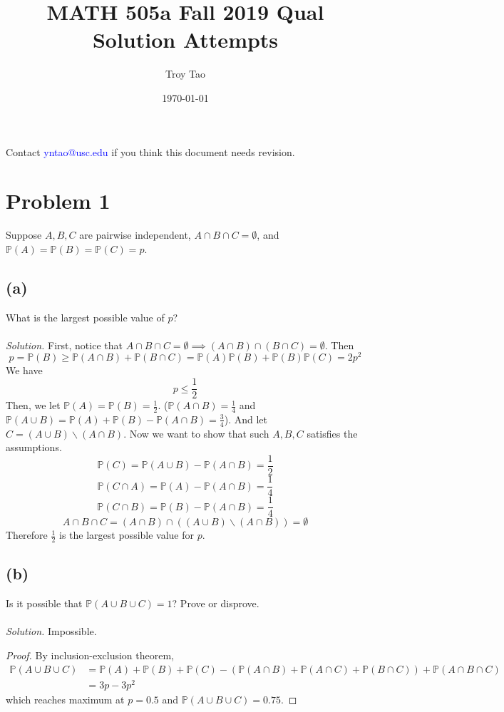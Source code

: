 \documentclass{article}
\title{MATH 505a Fall 2019 Qual Solution Attempts}
\author{Troy Tao}
\date\today
\newcommand{\prob}{\mathbb{P}}
\begin{document}
\maketitle 
Contact \textcolor{blue}{yntao@usc.edu} if you think this document needs revision.


\section*{Problem 1}
Suppose $A,B,C$ are pairwise independent, $A\cap B\cap C = \emptyset$, and $\prob(A)=\prob(B)=\prob(C)=p$.
\subsection*{(a)}
What is the largest possible value of $p$?
\color{blue}
\\\\\textit{Solution. }First, notice that $A\cap B\cap C = \emptyset \implies (A\cap B)\cap (B\cap C) = \emptyset$. Then 
$$p=\prob(B)\geq\prob(A\cap B)+\prob(B\cap C)=\prob(A)\prob(B)+\prob(B)\prob(C)=2p^2$$
We have
$$p\leq \frac{1}{2}$$
Then, we let $\prob(A)=\prob(B)=\frac{1}{2}$. ($\prob(A\cap B) = \frac{1}{4}$ and $\prob(A \cup B) = \prob(A)+\prob(B) - \prob(A\cap B) = \frac{3}{4}$). And let $C = (A\cup B)\backslash (A\cap B)$. Now we want to show that such $A,B,C$ satisfies the assumptions. 
$$\prob(C) = \prob(A\cup B)-\prob(A\cap B)=\frac{1}{2}$$
$$\prob(C\cap A) = \prob(A)-\prob(A\cap B) = \frac{1}{4}$$
$$\prob(C\cap B) = \prob(B)-\prob(A\cap B) = \frac{1}{4}$$
$$A\cap B\cap C =(A\cap B)\cap((A\cup B)\backslash(A\cap B))=\emptyset$$
Therefore $\frac{1}{2}$ is the largest possible value for $p$.
\color{black}
\subsection*{(b)}
Is it possible that $\prob(A\cup B\cup C)=1$? Prove or disprove.
\color{blue}
\\\\\textit{Solution. }Impossible.
\begin{proof}
By inclusion-exclusion theorem,
\begin{equation*}
    \begin{split}
        \prob(A\cup B\cup C) &= \prob(A)+\prob(B)+\prob(C)-(\prob(A\cap B)+\prob(A\cap C)+\prob(B\cap C))+\prob(A\cap B\cap C)\\
        &= 3p-3p^2
    \end{split}
\end{equation*}
which reaches maximum at $p = 0.5$ and $\prob(A\cup B\cup C)=0.75$.
\end{proof}
\color{black}
\end{document}

